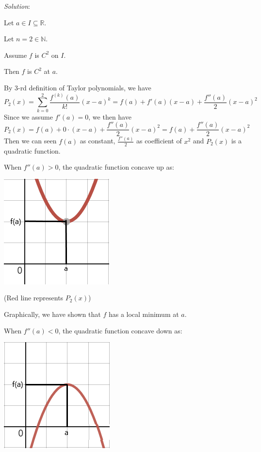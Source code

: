 \documentclass[12pt]{exam}
\newcommand{\R}{\mathbb{R}}
\newcommand{\N}{\mathbb{N}}
\begin{document}
\begin{enumerate}
\begin{enumerate}
			\emph{Solution}:
			
			Let $a \in I\subseteq\R$.
			
			Let $n=2\in\N$.
			
			Assume $f$ is $C^2$ on $I$.
			
			Then $f$ is $C^2$ at $a$.
			
			By 3-rd definition of Taylor polynomials, we have
			$$
			    P_2(x)=\sum_{k=0}^2 \frac{f^{(k)}(a)}{k!}(x-a)^k=f(a)+f'(a)(x-a)+\frac{f''(a)}{2}(x-a)^2
			$$
			Since we assume $f'(a) = 0$, we then have
			$$
			    P_2(x)=f(a)+0\cdot(x-a)+\frac{f''(a)}{2}(x-a)^2=f(a)+\frac{f''(a)}{2}(x-a)^2
			$$
			Then we can seen $f(a)$ as constant, $\frac{f''(a)}{2}$ as coefficient of $x^2$ and $P_2(x)$ is a quadratic function.
			
			When $f''(a)>0$, the quadratic function concave up as:
			\begin{center}
			    \includegraphics[scale=0.75]{Upward}
			    
			    (Red line represents $P_2(x)$)
			\end{center}
			Graphically, we have shown that $f$ has a local minimum at $a$.
			
			\newpage
			
			When $f''(a)<0$, the quadratic function concave down as:
			\begin{center}
			    \includegraphics[scale=0.75]{Downward}
			    

\end{center}
\end{enumerate}
\end{enumerate}
\end{document}
